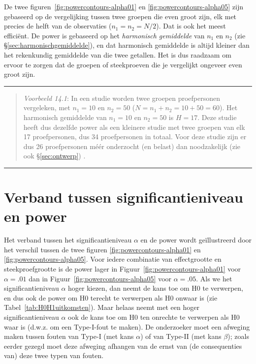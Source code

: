 \documentclass[
]{book}
\begin{document}
De twee figuren~\ref{fig:powercontours-alpha01} en
\ref{fig:powercontours-alpha05} zijn gebaseerd op de vergelijking tussen twee groepen die even groot zijn, elk met precies de helft van de observaties (\(n_1=n_2=N/2\)). Dat is ook het meest efficiënt.
De power is gebaseerd op het \emph{harmonisch gemiddelde} van \(n_1\) en \(n_2\) (zie §\ref{sec:harmonischgemiddelde}), en dat harmonisch gemiddelde is altijd kleiner dan het rekenkundig gemiddelde van die twee getallen. Het is dus raadzaam om ervoor te zorgen dat de groepen of steekproeven die je vergelijkt ongeveer even groot zijn.

\begin{center}\rule{0.5\linewidth}{0.5pt}\end{center}

\begin{quote}
\emph{Voorbeeld 14.1}: In een studie worden twee groepen proefpersonen vergeleken, met \(n_1=10\) en \(n_2=50\) (\(N=n_1+n_2=10+50=60\)). Het harmonisch gemiddelde van \(n_1=10\) en \(n_2=50\) is \(H=17\). Deze studie heeft dus dezelfde power als een kleinere studie met twee groepen van elk 17 proefpersonen, dus 34 proefpersonen in totaal. Voor deze studie zijn er dus 26 proefpersonen méér onderzocht (en belast) dan noodzakelijk (zie ook §\ref{sec:ontwerp}) \citep[p.295]{ACA11}.
\end{quote}

\begin{center}\rule{0.5\linewidth}{0.5pt}\end{center}

\section{Verband tussen significantieniveau en power}\label{sec:significantieniveau-power}

Het verband tussen het significantieniveau \(\alpha\) en de power wordt
geïllustreerd door het verschil tussen de twee figuren
\ref{fig:powercontours-alpha01} en
\ref{fig:powercontours-alpha05}. Voor iedere combinatie van
effectgrootte en steekproefgrootte is de power lager in
Figuur~\ref{fig:powercontours-alpha01} voor \(\alpha=.01\) dan in
Figuur~\ref{fig:powercontours-alpha05} voor \(\alpha=.05\). Als we het
significantieniveau \(\alpha\) hoger kiezen, dan neemt de kans toe om H0
te verwerpen, en dus ook de power om H0 terecht te verwerpen als H0
onwaar is (zie
Tabel~\ref{tab:H0H1uitkomsten}). Maar helaas neemt met een hoger
significantieniveau \(\alpha\) ook de kans toe om H0 ten onrechte te
verwerpen als H0 waar is (d.w.z. om een Type-I-fout te maken). De
onderzoeker moet een afweging maken tussen fouten van Type-I (met
kans \(\alpha\)) of van Type-II (met kans \(\beta\)); zoals eerder gezegd
moet deze afweging afhangen van de ernst van (de consequenties van) deze
twee typen van fouten.
\end{document}
